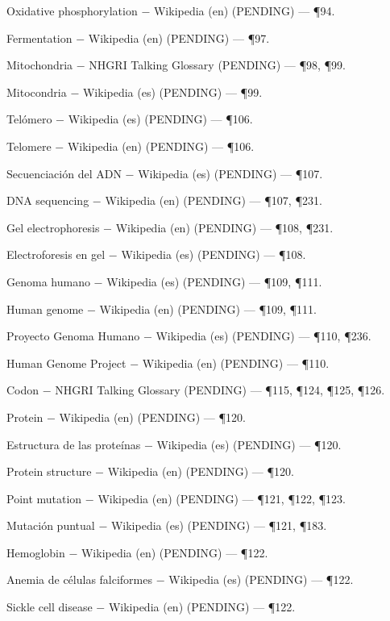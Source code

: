 \documentclass{book}
\begin{document}
\noindent Oxidative phosphorylation \(-\) Wikipedia (en) (PENDING) --- \P94.

\noindent Fermentation \(-\) Wikipedia (en) (PENDING) --- \P97.

\noindent Mitochondria \(-\) NHGRI Talking Glossary (PENDING) --- \P98, \P99.

\noindent Mitocondria \(-\) Wikipedia (es) (PENDING) --- \P99.

\noindent Telómero \(-\) Wikipedia (es) (PENDING) --- \P106.

\noindent Telomere \(-\) Wikipedia (en) (PENDING) --- \P106.

\noindent Secuenciación del ADN \(-\) Wikipedia (es) (PENDING) --- \P107.

\noindent DNA sequencing \(-\) Wikipedia (en) (PENDING) --- \P107, \P231.

\noindent Gel electrophoresis \(-\) Wikipedia (en) (PENDING) --- \P108, \P231.

\noindent Electroforesis en gel \(-\) Wikipedia (es) (PENDING) --- \P108.

\noindent Genoma humano \(-\) Wikipedia (es) (PENDING) --- \P109, \P111.

\noindent Human genome \(-\) Wikipedia (en) (PENDING) --- \P109, \P111.

\noindent Proyecto Genoma Humano \(-\) Wikipedia (es) (PENDING) --- \P110, \P236.

\noindent Human Genome Project \(-\) Wikipedia (en) (PENDING) --- \P110.

\noindent Codon \(-\) NHGRI Talking Glossary (PENDING) --- \P115, \P124, \P125, \P126.

\noindent Protein \(-\) Wikipedia (en) (PENDING) --- \P120.

\noindent Estructura de las proteínas \(-\) Wikipedia (es) (PENDING) --- \P120.

\noindent Protein structure \(-\) Wikipedia (en) (PENDING) --- \P120.

\noindent Point mutation \(-\) Wikipedia (en) (PENDING) --- \P121, \P122, \P123.

\noindent Mutación puntual \(-\) Wikipedia (es) (PENDING) --- \P121, \P183.

\noindent Hemoglobin \(-\) Wikipedia (en) (PENDING) --- \P122.

\noindent Anemia de células falciformes \(-\) Wikipedia (es) (PENDING) --- \P122.

\noindent Sickle cell disease \(-\) Wikipedia (en) (PENDING) --- \P122.
\end{document}
